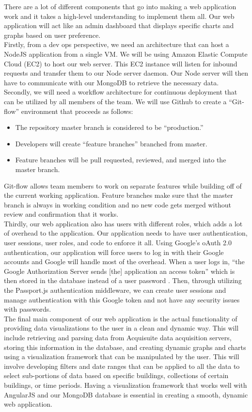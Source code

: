 \documentclass[onecolumn, draftclsnofoot,10pt, compsoc]{IEEEtran}
\begin{document}
There are a lot of different components that go into making a web application work and it takes a high-level understanding to implement them all. Our web application will act like an admin dashboard that displays specific charts and graphs based on user preference.\\
Firstly, from a dev ops perspective, we need an architecture that can host a NodeJS application from a single VM. We will be using Amazon Elastic Compute Cloud (EC2) to host our web server. This EC2 instance will listen for inbound requests and transfer them to our Node server daemon. Our Node server will then have to communicate with our MongoDB to retrieve the necessary data.\\
Secondly, we will need a workflow architecture for continuous deployment that can be utilized by all members of the team. We will use Github to create a ``Git-flow'' environment that proceeds as follows:
\begin{itemize}
    \item The repository master branch is considered to be ``production.''
    \item Developers will create ``feature branches'' branched from master.
    \item Feature branches will be pull requested, reviewed, and merged into the master branch.
\end{itemize}
Git-flow allows team members to work on separate features while building off of the current working application. Feature branches make sure that the master branch is always in working condition and no new code gets merged without review and confirmation that it works.\\
Thirdly, our web application also has users with different roles, which adds a lot of overhead to the application. Our application needs to have user authentication, user sessions, user roles, and code to enforce it all. Using Google's oAuth 2.0 authentication, our application will force users to log in with their Google accounts and Google will handle most of the overhead. When a user logs in, ``the Google Authorization Server sends [the] application an access token'' which is then stored in the database instead of a user password \cite{oauth}. Then, through utilizing the Passport.js authentication middleware, we can create user sessions and manage authentication with this Google token and not have any security issues with passwords.\\
The final main component of our web application is the actual functionality of providing data visualizations to the user in a clean and dynamic way. This will include retrieving and parsing data from Acquisuite data acquisition servers, storing this information in the database, and creating dynamic graphs and charts using a visualization framework that can be manipulated by the user. This will involve developing filters and date ranges that can be applied to all the data to select sub-portions of data based on specific buildings, collections of certain buildings, or time periods. Having a visualization framework that works well with AngularJS and our MongoDB database is essential in creating a smooth, dynamic web application. 
\end{document}
